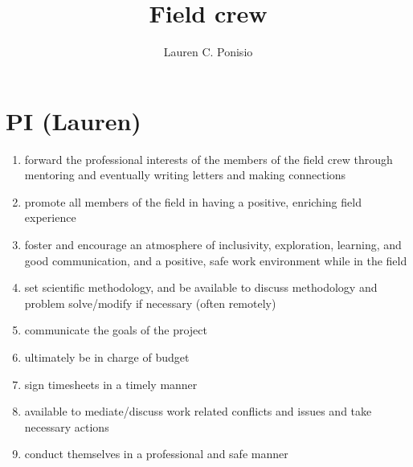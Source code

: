 \documentclass[12pt]{article}
\title{Field crew}
\author{Lauren C. Ponisio}
\begin{document}
\maketitle

\section{PI (Lauren)}
\begin{enumerate} 
\item forward the professional interests of the members of the field
  crew through mentoring and eventually writing letters and making
  connections 
\item promote all members of the field in having a positive, enriching
  field experience
\item foster and encourage an atmosphere of inclusivity, exploration,
  learning, and good communication, and a positive, safe work
  environment while in the field
\item set scientific methodology, and be available to discuss
  methodology and problem solve/modify if necessary (often remotely)
\item communicate the goals of the project
\item ultimately be in charge of budget
\item sign timesheets in a timely manner 
\item available to mediate/discuss work related conflicts and issues
  and take necessary actions
\item conduct themselves in a professional and safe manner
\end{enumerate}
\end{document}
